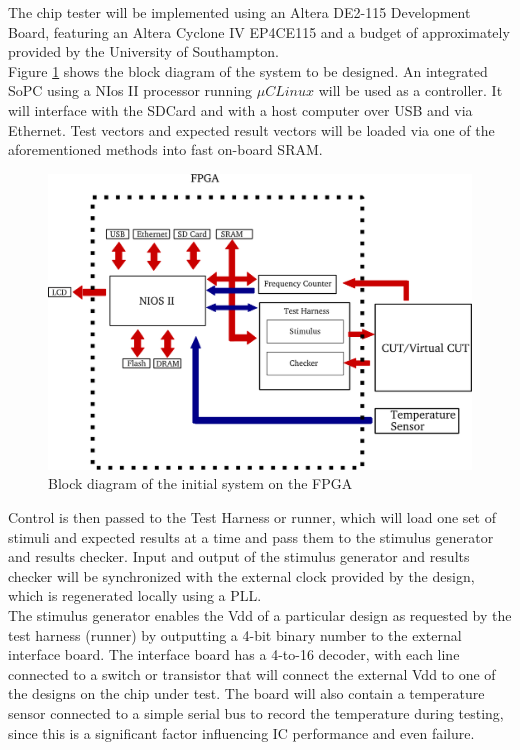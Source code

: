 \documentclass[a4paper,11pt]{report}
\begin{document}
The chip tester will be implemented using an Altera DE2-115 Development Board,
featuring an Altera Cyclone IV EP4CE115 and a budget of approximately
provided by the University of Southampton.
\\


Figure \ref{fig:block_diagram} shows the block diagram of the system to be
designed. An integrated SoPC using a NIos II processor running $\mu C Linux$
will be used as a controller. It will interface with the SDCard and with a host
computer over USB and via Ethernet. Test vectors and expected result vectors
will be loaded via one of the aforementioned methods into fast on-board SRAM.
\\

\begin{figure}[htb]
\centering
\includegraphics[scale=0.45]{Block_diagram_new.png}
\caption{Block diagram of the initial system on the FPGA}
\label{fig:block_diagram}
\end{figure}


Control is then passed to the Test Harness or runner, which will load one set
of stimuli and expected results at a time and pass them to the stimulus
generator and results checker. Input and output of the stimulus generator and
results checker will be synchronized with the external clock provided by the
design, which is regenerated locally using a PLL.
\\

The stimulus generator enables the Vdd of a particular design as requested by
the test harness (runner) by outputting a 4-bit binary number to the external
interface board. The interface board has a 4-to-16 decoder, with each line
connected to a switch or transistor that will connect the external Vdd to one
of the designs on the chip under test. The board will also contain a
temperature sensor connected to a simple serial bus to record the temperature
during testing, since this is a significant factor influencing IC performance
and even failure.
\\
\end{document}
